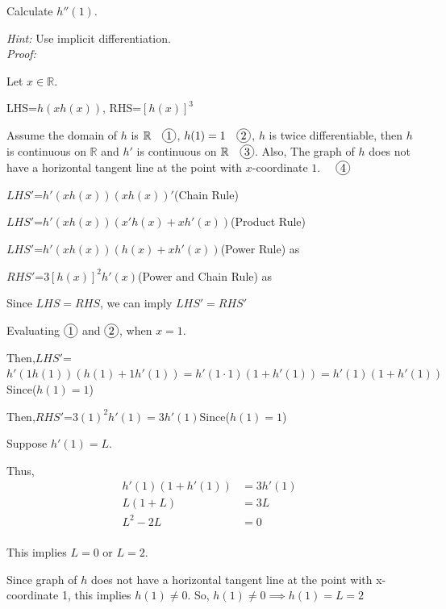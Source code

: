 \documentclass[12pt]{exam}
\newcommand {\DS} [1] {${\displaystyle #1}$}
\newcommand{\vv}{\vspace{.4cm}}
\newcommand{\R}{\mathbb{R}}
\newcommand*\circled[1]{\tikz[baseline=(char.base)]{
    \node[shape=circle, draw, inner sep=1pt, 
        minimum height=12pt] (char) {#1};}}
\begin{document}
\begin{enumerate}[resume]
	Calculate \DS{h''(1)}.
	
	\emph{Hint:} Use implicit differentiation.
	\vv
	\\
	
	\emph{Proof:}

	Let $x\in\R$.

	LHS=$h(xh(x))$, RHS=$[h(x)]^3$

	Assume the domain of $h$ is $\R \quad \circled{1}$, $h(1)=1 \quad \circled{2}$,
	$h$ is twice differentiable, 
	then $h$ is continuous on $\R$ and $h'$ is continuous on $\R \quad \circled{3}$.
	Also, The graph of $h$ does not have a horizontal tangent line at the point with $x$-coordinate $1$. $\quad \circled{4}$

	\DS{LHS'}=$h'(xh(x))(xh(x))'$\qquad(Chain Rule)

	\DS{LHS'}=$h'(xh(x))(x'h(x)+xh'(x))$\qquad(Product Rule)

	\DS{LHS'}=$h'(xh(x))(h(x)+xh'(x))$\qquad(Power Rule) as \quad \circled{1}

	\DS{RHS'}=$3[h(x)]^2h'(x)$\qquad(Power and Chain Rule) as \quad \circled{2}

	Since $LHS=RHS$, we can imply $LHS'=RHS'$

	Evaluating $\circled{1}$ and $\circled{2}$, when $x=1$. 

	Then,\DS{LHS'}=$h'(1h(1))(h(1)+1h'(1))=h'(1\cdot1)(1+h'(1))=h'(1)(1+h'(1))$\qquad Since($h(1)=1$)

	Then,\DS{RHS'}=$3(1)^2h'(1)=3h'(1)$\qquad Since($h(1)=1$)

	Suppose $h'(1)=L.$

	Thus,
	\begin{align*}
	    h'(1)(1+h'(1))&=3h'(1) \\
	    L(1+L)&=3L \\
	    L^2-2L&=0 \\
	\end{align*}


	This implies $L=0$ or $L=2.$

	Since graph of $h$ does not have a horizontal tangent line at the point with x-coordinate 1, this implies $h(1)\neq0$.
	So, $h(1)\neq 0 \implies h(1)=L=2$\\


\end{enumerate}
\end{document}

